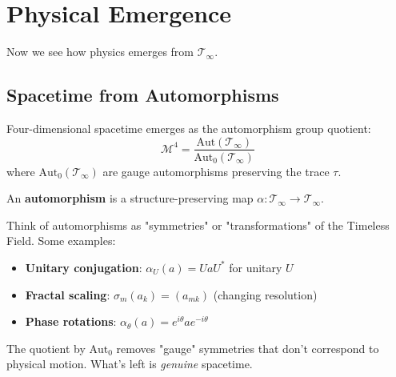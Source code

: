 \section{Physical Emergence}
\label{sec:physical-emergence}

Now we see how physics emerges from $\mathcal{T}_\infty$.

\subsection{Spacetime from Automorphisms}
\label{sec:spacetime-emergence}

\begin{thm}\label{thm:spacetime-emergence}
Four-dimensional spacetime emerges as the automorphism group quotient:
\begin{equation}
\boxed{\mathcal{M}^4 = \frac{\text{Aut}(\mathcal{T}_\infty)}{\text{Aut}_0(\mathcal{T}_\infty)}}
\end{equation}
where $\text{Aut}_0(\mathcal{T}_\infty)$ are gauge automorphisms preserving the trace $\tau$.
\end{thm}

\begin{intuitive}
An \textbf{automorphism} is a structure-preserving map $\alpha: \mathcal{T}_\infty \to \mathcal{T}_\infty$.

Think of automorphisms as "symmetries" or "transformations" of the Timeless Field. Some examples:
\begin{itemize}
\item \textbf{Unitary conjugation}: $\alpha_U(a) = U a U^*$ for unitary $U$
\item \textbf{Fractal scaling}: $\sigma_m(a_k) = (a_{mk})$ (changing resolution)
\item \textbf{Phase rotations}: $\alpha_\theta(a) = e^{i\theta} a e^{-i\theta}$
\end{itemize}

The quotient by $\text{Aut}_0$ removes "gauge" symmetries that don't correspond to physical motion. What's left is \textit{genuine} spacetime.
\end{intuitive}

